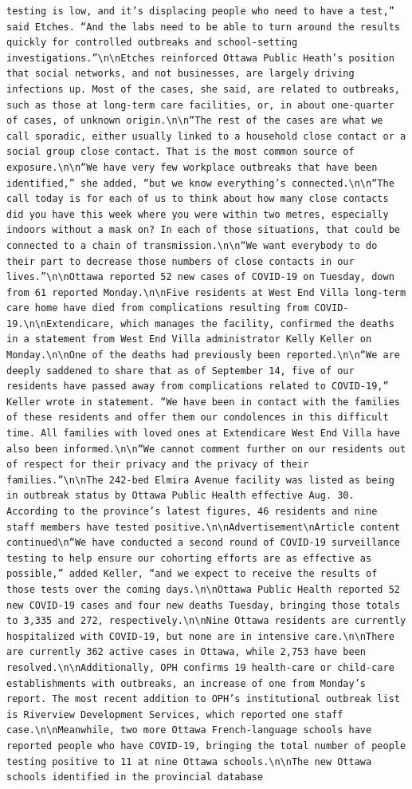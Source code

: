 \documentclass[]{article}
\begin{document}
\begin{verbatim}
testing is low, and it’s displacing people who need to have a test,” said Etches. “And the labs need to be able to turn around the results quickly for controlled outbreaks and school-setting investigations.”\n\nEtches reinforced Ottawa Public Heath’s position that social networks, and not businesses, are largely driving infections up. Most of the cases, she said, are related to outbreaks, such as those at long-term care facilities, or, in about one-quarter of cases, of unknown origin.\n\n“The rest of the cases are what we call sporadic, either usually linked to a household close contact or a social group close contact. That is the most common source of exposure.\n\n“We have very few workplace outbreaks that have been identified,” she added, “but we know everything’s connected.\n\n“The call today is for each of us to think about how many close contacts did you have this week where you were within two metres, especially indoors without a mask on? In each of those situations, that could be connected to a chain of transmission.\n\n“We want everybody to do their part to decrease those numbers of close contacts in our lives.”\n\nOttawa reported 52 new cases of COVID-19 on Tuesday, down from 61 reported Monday.\n\nFive residents at West End Villa long-term care home have died from complications resulting from COVID-19.\n\nExtendicare, which manages the facility, confirmed the deaths in a statement from West End Villa administrator Kelly Keller on Monday.\n\nOne of the deaths had previously been reported.\n\n“We are deeply saddened to share that as of September 14, five of our residents have passed away from complications related to COVID-19,” Keller wrote in statement. “We have been in contact with the families of these residents and offer them our condolences in this difficult time. All families with loved ones at Extendicare West End Villa have also been informed.\n\n“We cannot comment further on our residents out of respect for their privacy and the privacy of their families.”\n\nThe 242-bed Elmira Avenue facility was listed as being in outbreak status by Ottawa Public Health effective Aug. 30. According to the province’s latest figures, 46 residents and nine staff members have tested positive.\n\nAdvertisement\nArticle content continued\n“We have conducted a second round of COVID-19 surveillance testing to help ensure our cohorting efforts are as effective as possible,” added Keller, “and we expect to receive the results of those tests over the coming days.\n\nOttawa Public Health reported 52 new COVID-19 cases and four new deaths Tuesday, bringing those totals to 3,335 and 272, respectively.\n\nNine Ottawa residents are currently hospitalized with COVID-19, but none are in intensive care.\n\nThere are currently 362 active cases in Ottawa, while 2,753 have been resolved.\n\nAdditionally, OPH confirms 19 health-care or child-care establishments with outbreaks, an increase of one from Monday’s report. The most recent addition to OPH’s institutional outbreak list is Riverview Development Services, which reported one staff case.\n\nMeanwhile, two more Ottawa French-language schools have reported people who have COVID-19, bringing the total number of people testing positive to 11 at nine Ottawa schools.\n\nThe new Ottawa schools identified in the provincial database 
\end{verbatim}
\end{document}
